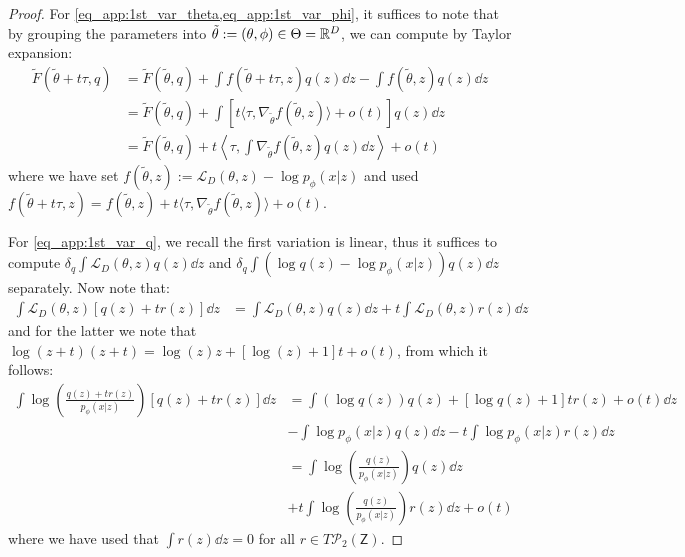 \begin{proof}
    For \cref{eq_app:1st_var_theta,eq_app:1st_var_phi}, it suffices to note that by grouping the parameters into $\tilde\theta := (\theta, \phi) \in \Theta=\mathbb{R}^{D}$, we can compute by Taylor expansion:
\begin{align*}
        \tilde{F}(\tilde{\theta} + t\tau, q) &= \tilde{F}(\tilde{\theta},q) + \int f(\tilde{\theta} + t\tau, z) q(z) \dd z -\int f(\tilde{\theta}, z) q(z) \dd z \\
&= \tilde{F}(\tilde{\theta},q) + \int [t \langle \tau, \nabla_{\tilde{\theta}} f(\tilde{\theta}, z) \rangle + o(t)] q(z) \dd z \\
&= \tilde{F}(\tilde\theta, q) + t \left\langle \tau, \int \nabla_{\tilde{\theta}} f(\tilde{\theta}, z) q(z) \dd z \right\rangle + o(t)
\end{align*}
where we have set $f(\tilde\theta, z):= \mathcal{L}_D(\theta, z) - \log p_\phi( x|z)$ and used $f(\tilde\theta + t\tau, z) = f(\tilde\theta, z) + t \langle \tau, \nabla_{\tilde\theta} f(\tilde\theta, z) \rangle + o(t)$. 

For \eqref{eq_app:1st_var_q}, we recall the first variation is linear, thus it suffices to compute $\delta_q \int \mathcal{L}_D(\theta, z) q(z)\dd z$ and $\delta_q\int (\log {q(z)} - \log {p_\phi( x|z)}) q(z)\dd z$ separately. Now note that:
\begin{align*}
    \int \mathcal{L}_D(\theta, z) [q(z)+tr(z)]\dd z &= \int \mathcal{L}_D(\theta, z) q(z)\dd z + t\int \mathcal{L}_D(\theta, z) r(z) \dd z
\end{align*}
and for the latter we note that $\log(z + t)(z + t) = \log(z)z + [\log(z) + 1]t + o(t)$, from which it follows:
\begin{align*}
    \int \log \left(\frac{q(z)+tr(z)}{p_\phi( x|z)}\right) [q(z)+tr(z)]\dd z 
    &= \int (\log q(z)) q(z)+ [\log q(z) + 1] tr(z) +o(t) \dd z \\
    &- \int \log p_\phi( x|z) q(z) \dd z - t\int \log p_\phi( x|z) r(z) \dd z \\
    &= \int \log \left(\frac{q(z)}{p_\phi( x|z)}\right) q(z)\dd z \\&+ t \int \log \left(\frac{q(z)}{p_\phi( x|z)}\right) r(z) \dd z + o(t)
\end{align*}
where we have used that $\int r(z)\dd z=0$ for all $r\in T\mathcal{P}_2(\mathsf{Z})$.
\end{proof}

